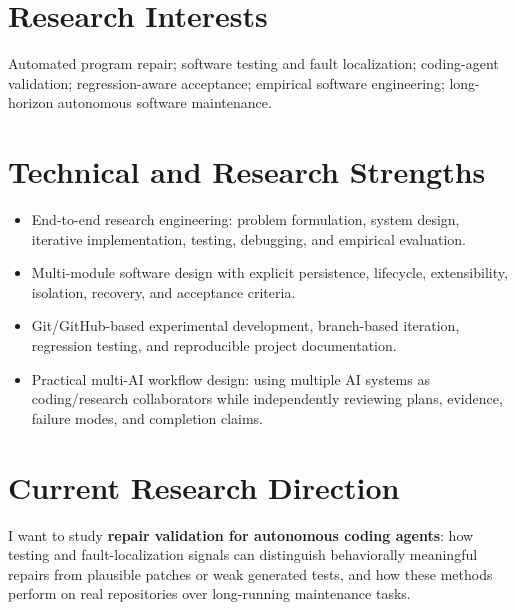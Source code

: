 \documentclass[10pt,a4paper]{article}
\begin{document}
\section{Research Interests}
Automated program repair; software testing and fault localization; coding-agent validation; regression-aware acceptance; empirical software engineering; long-horizon autonomous software maintenance.

\section{Technical and Research Strengths}
\begin{itemize}
  \item End-to-end research engineering: problem formulation, system design, iterative implementation, testing, debugging, and empirical evaluation.
  \item Multi-module software design with explicit persistence, lifecycle, extensibility, isolation, recovery, and acceptance criteria.
  \item Git/GitHub-based experimental development, branch-based iteration, regression testing, and reproducible project documentation.
  \item Practical multi-AI workflow design: using multiple AI systems as coding/research collaborators while independently reviewing plans, evidence, failure modes, and completion claims.
\end{itemize}

\section{Current Research Direction}
I want to study \textbf{repair validation for autonomous coding agents}: how testing and fault-localization signals can distinguish behaviorally meaningful repairs from plausible patches or weak generated tests, and how these methods perform on real repositories over long-running maintenance tasks.
\end{document}
